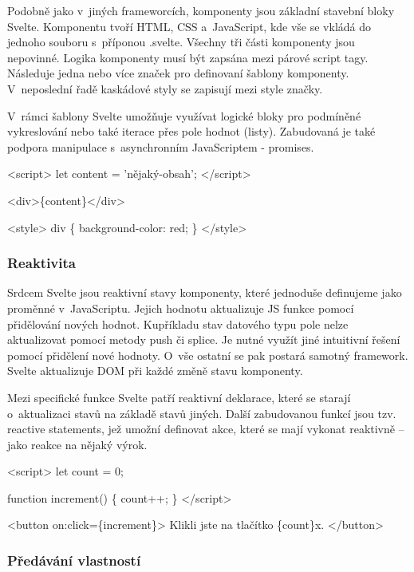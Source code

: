 Podobně jako v~jiných frameworcích, komponenty jsou základní stavební bloky Svelte. Komponentu tvoří HTML, CSS a~JavaScript, kde vše se vkládá do jednoho souboru s~příponou .svelte. 
Všechny tři části komponenty jsou nepovinné. Logika komponenty musí být zapsána mezi párové script tagy. Následuje jedna nebo více značek pro definovaní šablony komponenty. 
V~neposlední řadě kaskádové styly se zapisují mezi style značky.

V~rámci šablony Svelte umožňuje využívat logické bloky pro podmíněné vykreslování nebo také iterace přes pole hodnot (listy). 
Zabudovaná je také podpora manipulace s~asynchronním JavaScriptem - promises.\cite{svelte}

\begin{prog}
<script>
  let content = 'nějaký-obsah';
</script>

<div>\{content\}</div>
  
<style>
  div \{
    background-color: red;
  \}
</style>
\end{prog}

\subsubsection{Reaktivita}

Srdcem Svelte jsou reaktivní stavy komponenty, které jednoduše definujeme jako proměnné v~JavaScriptu. Jejich hodnotu aktualizuje JS funkce pomocí přidělování nových hodnot. 
Kupříkladu stav datového typu pole nelze aktualizovat pomocí metody push či splice. Je nutné využít jiné intuitivní řešení pomocí přidělení nové hodnoty.
O~vše ostatní se pak postará samotný framework. Svelte aktualizuje DOM při každé změně stavu komponenty. 

Mezi specifické funkce Svelte patří reaktivní deklarace, které se starají o~aktualizaci stavů na základě stavů jiných. 
Další zabudovanou funkcí jsou tzv. reactive statements, jež umožní definovat akce, které se mají vykonat reaktivně -- jako reakce na nějaký výrok.\cite{sveltehandbook,svelte}

\begin{prog}
<script>
  let count = 0;

  function increment() \{
    count++;
  \}
</script>

<button on:click=\{increment\}>
  Klikli jste na tlačítko \{count\}x.
</button>
\end{prog}

\subsubsection{Předávání vlastností}

